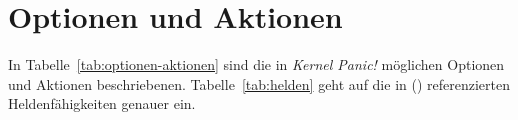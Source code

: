 \section{Optionen und Aktionen}


%
%
%

In Tabelle~\ref{tab:optionen-aktionen} sind die in \emph{Kernel Panic!}
möglichen Optionen und Aktionen beschriebenen. Tabelle~\ref{tab:helden} geht
auf die in () referenzierten Heldenfähigkeiten genauer
ein.

